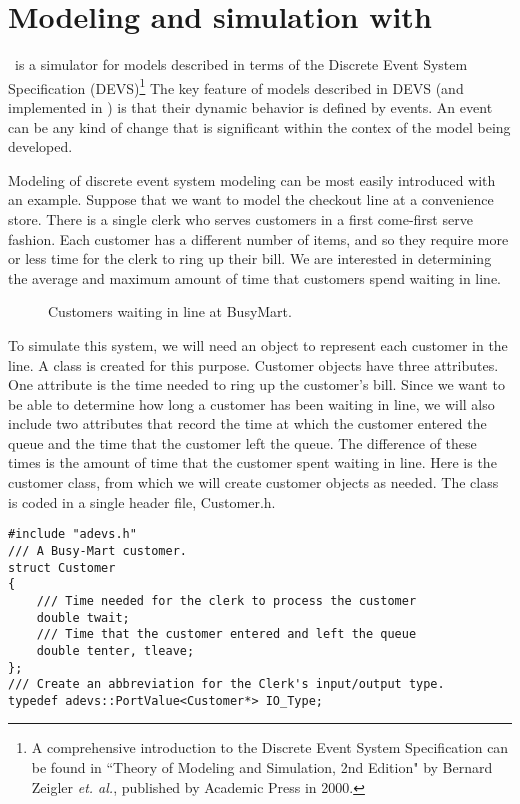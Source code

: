 \chapter{Modeling and simulation with \adevs}
\label{chapter:intro}
\adevs\ is a simulator for models described in terms of the Discrete Event
System Specification (DEVS)\footnote{A comprehensive introduction to the Discrete Event System Specification can be found in ``Theory of Modeling and Simulation, 2nd Edition" by Bernard Zeigler \textit{et. al.}, published by Academic Press in 2000.} The key feature of models described in DEVS (and implemented in
\adevs) is that their dynamic behavior is defined by events. An event can be any kind of change that is significant within the contex of the model being developed.

Modeling of discrete event system modeling can be most easily introduced with an example. Suppose that we want to model the checkout line at a convenience store. There is a single clerk who serves customers in a first come-first serve fashion. Each customer has a different number of items, and so they require more or less time for the clerk to ring up their bill. We are interested in determining the average and maximum amount of time that customers spend waiting in line.
\begin{figure}[ht]
\centering
{}
\caption{Customers waiting in line at BusyMart.}
\label{fig:busy_mart}
\end{figure}

To simulate this system, we will need an object to represent each customer in the line. 
A  class is created for this purpose.
Customer objects have three attributes.
One attribute is the time needed to
ring up the customer's bill. Since we want to be able to determine
how long a customer has been waiting in line, we will also include
two attributes that record the time at which the customer entered the
queue and the time that the customer left the queue. The difference of these times is the amount of time that the customer spent waiting in line.
Here is the customer class, from which we will create customer
objects as needed. The class is coded in a single header file,
Customer.h.
\begin{verbatim}
#include "adevs.h"
/// A Busy-Mart customer.
struct Customer
{
    /// Time needed for the clerk to process the customer
    double twait;
    /// Time that the customer entered and left the queue
    double tenter, tleave;
};
/// Create an abbreviation for the Clerk's input/output type.
typedef adevs::PortValue<Customer*> IO_Type;
\end{verbatim}

